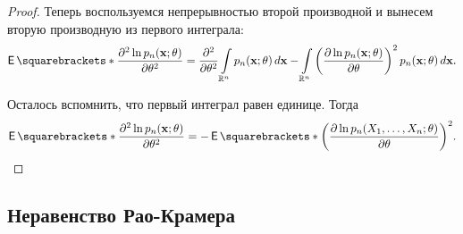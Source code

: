 \begin{proof}
	Теперь воспользуемся непрерывностью второй производной и вынесем вторую 
	производную из первого интеграла:
	\[
		\E{\frac{\partial^{2} \ln p_{n}(\mathbf{x}; \theta)}{\partial 
		\theta^{2}}} = \frac{\partial^{2}}{\partial \theta^{2}} 
		\int\limits_{\R^{n}} p_{n}(\mathbf{x}; \theta)\diff 
		\mathbf{x} - \int\limits_{\R^{n}} \left(\frac{\partial \ln 
		p_{n}(\mathbf{x}; \theta)}{\partial \theta}\right)^{2}p_{n} 
		(\mathbf{x}; \theta) \diff \mathbf{x}.
	\]
	
	Осталось вспомнить, что первый интеграл равен единице. Тогда
	\[
		\E{\frac{\partial^{2} \ln p_{n}(\mathbf{x}; \theta)}{\partial 
		\theta^{2}}} = -\E{\left(\frac{\partial \ln p_{n}(X_{1}, \dots, X_{n}; 
		\theta)}{\partial \theta}\right)^{2}}. \qedhere
	\]
\end{proof}

\subsection{Неравенство Рао-Крамера}

